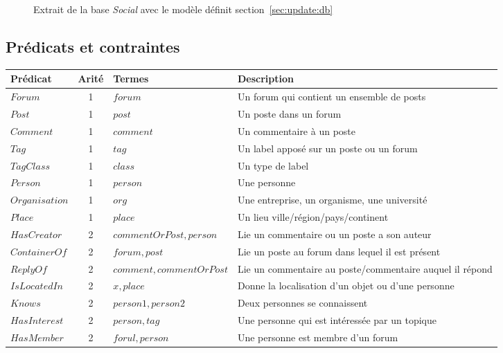 \begin{figure}[H]
    \caption{Extrait de la base \textit{Social} avec le modèle définit section~\ref{sec:update:db}}
\end{figure}

\subsection{Prédicats et contraintes}

\begin{table}[H]
    \centering
    \begin{adjustbox}{width=\linewidth}
        \begin{tabular}{l|c|l|l}
            Prédicat & Arité & Termes & Description \\
            \hline
            \hline
            $Forum$ & 1 & $forum$ & Un forum qui contient un ensemble de posts \\
            $Post$ & 1 & $post$ & Un poste dans un forum \\
            $Comment$ & 1 & $comment$ & Un commentaire à un poste \\
            $Tag$ & 1 & $tag$ & Un label apposé sur un poste ou un forum \\
            $TagClass$ & 1 & $class$ & Un type de label \\
            $Person$ & 1 & $person$ & Une personne \\
            $Organisation$ & 1 & $org$ & Une entreprise, un organisme, une université \\
            $Place$ & 1 & $place$ & Un lieu ville/région/pays/continent \\
            $HasCreator$ & 2 & $commentOrPost, person$ & Lie un commentaire ou un poste a son auteur \\
            $ContainerOf$ & 2 & $forum, post$ & Lie un poste au forum dans lequel il est présent \\
            $ReplyOf$ & 2 & $comment, commentOrPost$ & Lie un commentaire au poste/commentaire auquel il répond \\
            $IsLocatedIn$ & 2 & $x, place$ & Donne la localisation d'un objet ou d'une personne \\
            $Knows$ & 2 & $person1, person2$ & Deux personnes se connaissent \\
            $HasInterest$ & 2 & $person, tag$ & Une personne qui est intéressée par un topique \\
            $HasMember$ & 2 & $forul, person$ & Une personne est membre d'un forum \\

\end{tabular}
\end{adjustbox}
\end{table}
